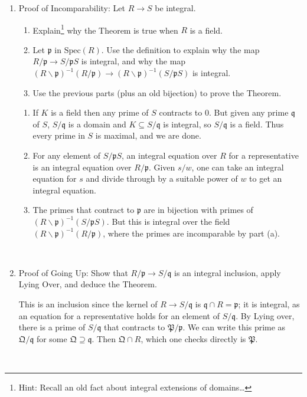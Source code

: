 \documentclass[12pt]{amsart}
\newcommand{\Bold}[1]{\contour{black}{#1}}
\newcommand{\p}{\mathfrak{p}}
\newcommand{\q}{\mathfrak{q}}
\newcommand{\Spec}{\mathrm{Spec}}
\renewcommand{\1}{\mathbbm{1}}
\newcommand{\solution}[1]{\ifthenelse {\equal{\displaysol}{1}} {\begin{framed}{\color{meretale}\noindent #1}\end{framed}} { \ }}
\newcommand\itemA{\stepcounter{enumi}\item[{\Bold{(\theenumi)}}]}
\newcommand\itemB{\stepcounter{enumi}\item[(\theenumi)]}
\newcommand\itema{\stepcounter{enumii}\item[{\Bold{(\theenumii)}}]}
\begin{document}
\begin{enumerate}
\itemA Proof of Incomparability: Let $R\to S$ be integral.
\begin{enumerate}
\itema Explain\footnote{Hint: Recall an old fact about integral extensions of domains\dots} why the Theorem is true when $R$ is a field.
\itema Let $\p$ in $\Spec(R)$. Use the definition to explain why the map $R/\p \to S/\p S$ is integral, and why the map $(R\smallsetminus \p)^{-1}(R/\p) \to (R\smallsetminus \p)^{-1}(S/\p S)$ is integral.
\itema Use the previous parts (plus an old bijection) to prove the Theorem.
\end{enumerate}

\solution{
\begin{enumerate}
\itema If $K$ is a field then any prime of $S$ contracts to $0$. But given any prime $\q$ of $S$, $S/\q$ is a domain and $K\subseteq S/\q$ is integral, so $S/\q$ is a field. Thus every prime in $S$ is maximal, and we are done.
\itema For any element of $S/\p S$, an integral equation over $R$ for a representative is an integral equation over $R/\p$. Given $s/w$, one can take an integral equation for $s$ and divide through by a suitable power of $w$ to get an integral equation.
\itema The primes that contract to $\p$ are in bijection with primes of $(R\smallsetminus \p)^{-1}(S/\p S)$. But this is integral over the field $(R\smallsetminus \p)^{-1}(R/\p)$, where the primes are incomparable by part (a).
\end{enumerate}
}

\itemB Proof of Going Up: Show that $R/\p \to S/\q$ is an integral inclusion, apply Lying Over, and deduce the Theorem.

\solution{This is an inclusion since the kernel of $R\to S/\q$ is $\q \cap R = \p$; it is integral, as an equation for a representative holds for an element of $S/\q$. By Lying over, there is a prime of $S/\q$ that contracts to $\mathfrak{P}/\p$. We can write this prime as $\mathfrak{Q}/\q$ for some $\mathfrak{Q}\supseteq \q$. Then $\mathfrak{Q} \cap R$, which one checks directly is $\mathfrak{P}$.
}


\end{enumerate}
\end{document}
